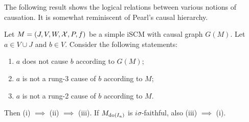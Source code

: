 The following result shows the logical relations between various notions of causation.
It is somewhat reminiscent of Pearl's causal hierarchy.

\begin{Thm}\label{thm:scm_causes}
  Let $M = \left ( J, V, W, \mathcal{X}, P, f \right )$ be a simple iSCM with causal graph $G(M)$.
  Let $a \in V \cup J$ and $b \in V$.
  Consider the following statements:
  \begin{enumerate}
    \item $a$ does not cause $b$ according to $G(M)$;
    \item $a$ is not a rung-3 cause of $b$ according to $M$;
    \item $a$ is not a rung-2 cause of $b$ according to $M$.
  \end{enumerate}
  Then (i) $\implies$ (ii) $\implies$ (iii). 
  If $M_{\operatorname{do}(I_a)}$ is $i\sigma$-faithful, also (iii) $\implies$ (i).
\end{Thm}
